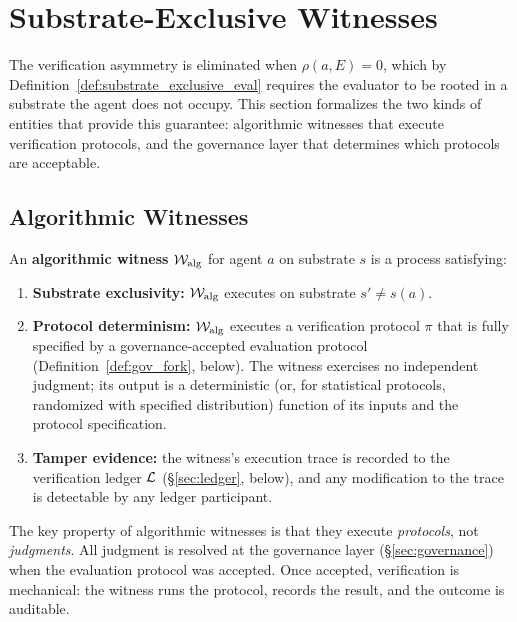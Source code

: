 \section{Substrate-Exclusive Witnesses}
\label{sec:witnesses}

The verification asymmetry is eliminated when $\rho(a, E) = 0$, which
by Definition~\ref{def:substrate_exclusive_eval} requires the evaluator
to be rooted in a substrate the agent does not occupy.  This section
formalizes the two kinds of entities that provide this guarantee:
algorithmic witnesses that execute verification protocols, and the
governance layer that determines which protocols are acceptable.

\subsection{Algorithmic Witnesses}
\label{sec:alg_witnesses}

\begin{definition}
\label{def:alg_witness}
An \textbf{algorithmic witness} $\mathcal{W}_{\mathrm{alg}}$ for agent $a$
on substrate $s$ is a process satisfying:
\begin{enumerate}
    \item \textbf{Substrate exclusivity:} $\mathcal{W}_{\mathrm{alg}}$
    executes on substrate $s' \neq s(a)$.
    \item \textbf{Protocol determinism:} $\mathcal{W}_{\mathrm{alg}}$
    executes a verification protocol $\pi$ that is fully specified by a
    governance-accepted evaluation protocol
    (Definition~\ref{def:gov_fork}, below).
    The witness exercises no independent judgment; its output is a
    deterministic (or, for statistical protocols, randomized with
    specified distribution) function of its inputs and the protocol
    specification.
    \item \textbf{Tamper evidence:} the witness's execution trace is
    recorded to the verification ledger $\mathcal{L}$
    (\S\ref{sec:ledger}, below), and any modification to the trace is
    detectable by any ledger participant.
\end{enumerate}
\end{definition}

The key property of algorithmic witnesses is that they execute
\emph{protocols}, not \emph{judgments}.  All judgment is resolved at the
governance layer (\S\ref{sec:governance}) when the evaluation protocol
was accepted.  Once accepted, verification is mechanical: the witness
runs the protocol, records the result, and the outcome is auditable.

